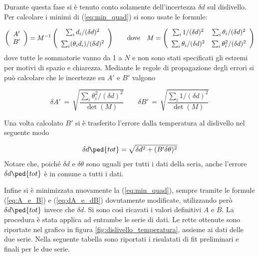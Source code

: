 Durante questa fase si è tenuto conto solamente dell'incertezza $\delta d$ sul dislivello. Per calcolare i minimi
di (\ref{eq:min_quad}) si sono usate le formule:

\begin{equation}
    \left(
    \begin{array}{c}
        A' \\
        B'
    \end{array} 
    \right)
    =
    M^{-1}
    \left(
    \begin{array}{c}
        \sum_i d_i/(\delta d)^2 \\[2mm]
        \sum_i (\theta_i d_i)/(\delta d)^2
    \end{array} 
    \right)
    \qquad 
    \text{dove}
    \quad
    M =
    \left(
    \begin{array}{c c}
        \sum_i 1/(\delta d)^2 & \sum_i \theta_i/(\delta d)^2 \\[2mm]
        \sum_i \theta_i/(\delta d)^2 & \sum_i \theta_i^2/(\delta d)^2
    \end{array} 
    \right)
    \label{eq:A_e_B}
\end{equation}
%
dove tutte le sommatorie vanno da 1 a $N$ e non sono stati specificati gli estremi per motivi di spazio e chiarezza. Mediante le regole
di propagazione degli errori si può calcolare che le incertezze su $A'$ e $B'$ valgono

\begin{equation}
    \delta A' \,=\, \sqrt{\frac{\sum_i \theta_i^2/(\delta d)^2}{\det(M)}}
    \qquad
    \delta B' \,=\, \sqrt{\frac{\sum_i 1/(\delta d)^2}{\det(M)}}
    \label{eq:dA_e_dB}
\end{equation}

Una volta calcolato $B'$ si è trasferito l'errore dalla temperatura al dislivello nel seguente modo

\begin{equation}
    \delta d\ped{tot} = \sqrt{\delta d^2 + (B'\delta \theta)^2}
\end{equation}
%
Notare che, poiché $\delta d$ e $\delta \theta$ sono uguali per tutti i dati della seria,
anche l'errore $\delta d\ped{tot}$ è in comune a tutti i dati.

Infine si è minimizzata nuovamente la (\ref{eq:min_quad}), sempre tramite le formule (\ref{eq:A_e_B}) e (\ref{eq:dA_e_dB})
dovutamente modificate, utilizzando però $\delta d\ped{tot}$ invece che $\delta d$.
%
Si sono così ricavati i valori definitivi $A$ e $B$. La procedura è stata applica ad entrambe le serie di dati.
Le rette ottenute sono riportate nel grafico in figura \ref{fig:dislivello_temperatura}, assieme ai dati delle due serie.
Nella seguente tabella sono riportati i risulatati di fit preliminari e finali per le due serie.

